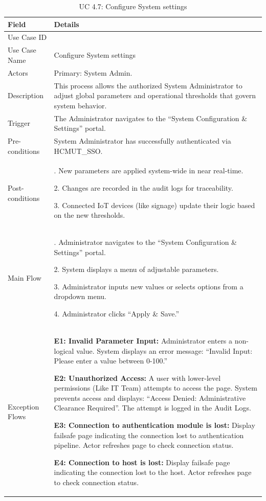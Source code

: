 \begin{table}[H]
\small
\renewcommand{\arraystretch}{1.4}
\begin{tabularx}{\textwidth}{|>{\raggedright\arraybackslash}p{3.5cm}|>{\RaggedRight\arraybackslash}X|}
\hline
\rowcolor{gray!20} \textbf{Field} & \textbf{Details} \\
\hline
Use Case ID & 4.7 \\
\hline
Use Case Name & Configure System settings \\
\hline
Actors & Primary: System Admin. \\
\hline
Description & This process allows the authorized System Administrator to adjust global parameters and operational thresholds that govern system behavior. \\
\hline
Trigger & The Administrator navigates to the ``System Configuration \& Settings'' portal. \\
\hline
Pre-conditions & System Administrator has successfully authenticated via HCMUT\_SSO. \\
\hline
Post-conditions & 1. New parameters are applied system-wide in near real-time. \par 2. Changes are recorded in the audit logs for traceability. \par 3. Connected IoT devices (like signage) update their logic based on the new thresholds. \\
\hline
Main Flow & 
1. Administrator navigates to the ``System Configuration \& Settings'' portal. \par
2. System displays a menu of adjustable parameters. \par
3. Administrator inputs new values or selects options from a dropdown menu. \par
4. Administrator clicks ``Apply \& Save.'' \\
\hline
Exception Flows & 
\textbf{E1: Invalid Parameter Input:} Administrator enters a non-logical value. System displays an error message: ``Invalid Input: Please enter a value between 0-100.'' \par \vspace{0.5em}
\textbf{E2: Unauthorized Access:} A user with lower-level permissions (Like IT Team) attempts to access the page. System prevents access and displays: ``Access Denied: Administrative Clearance Required''. The attempt is logged in the Audit Logs. \par \vspace{0.5em}
\textbf{E3: Connection to authentication module is lost:} Display failsafe page indicating the connection lost to authentication pipeline. Actor refreshes page to check connection status. \par \vspace{0.5em}
\textbf{E4: Connection to host is lost:} Display failsafe page indicating the connection lost to the host. Actor refreshes page to check connection status. \\
\hline
\end{tabularx}
\caption{UC 4.7: Configure System settings}
\label{tab:uc4.7}
\end{table}